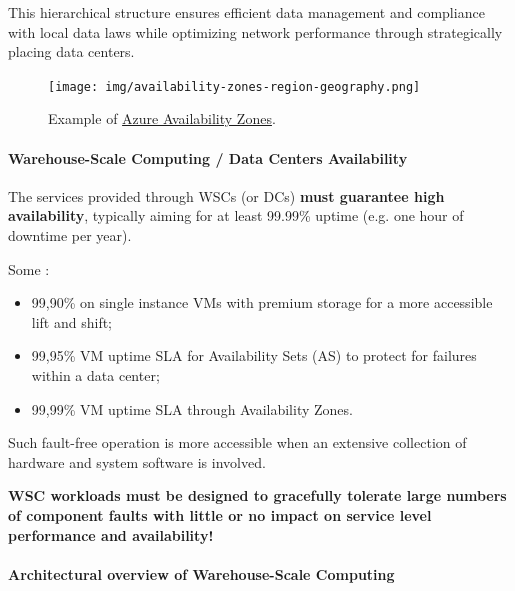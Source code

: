 \highspace
This hierarchical structure ensures efficient data management and compliance with local data laws while optimizing network performance through strategically placing data centers.

\begin{figure}[!htp]
    \centering
    \texttt{[image: img/availability-zones-region-geography.png]}
    \caption{Example of \href{https://learn.microsoft.com/en-us/azure/reliability/availability-zones-overview?tabs=azure-cli}{Azure Availability Zones}.}
\end{figure}

\newpage

\paragraph{Warehouse-Scale Computing / Data Centers Availability}

The services provided through WSCs (or DCs) \textbf{must guarantee high availability}, typically aiming for at least 99.99\% uptime (e.g. one hour of downtime per year).

\highspace
Some :
\begin{itemize}
    \item 99,90\% on single instance VMs with premium storage for a more accessible lift and shift;
    
    \item 99,95\% VM uptime SLA for Availability Sets (AS) to protect for failures within a data center;

    \item 99,99\% VM uptime SLA through Availability Zones.
\end{itemize}
Such fault-free operation is more accessible when an extensive collection of hardware and system software is involved.

\highspace
\textbf{WSC workloads must be designed to gracefully tolerate large numbers of component faults with little or no impact on service level performance and availability!}

\hfill

\longline

\hfill

\paragraph{Architectural overview of Warehouse-Scale Computing}

